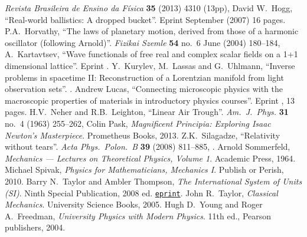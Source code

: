 \begin{thebibliography}{99}
  \emph{Revista Brasileira de Ensino da F\'isica} \textbf{35} 
  (2013) 4310 (13pp), 
  David W.~Hogg, ``Real-world ballistics: A dropped bucket''.
  Eprint  September (2007) 16 pages.
  P.A.~Horvathy,
  ``The laws of planetary motion, derived from those of a harmonic oscillator (following Arnold)''.
  \emph{Fizikai Szemle} \textbf{54} no.~6 June (2004) 180--184,
  A.~Kartavtsev,
  ``Wave functionals of free real and complex scalar fields on a 1+1 dimensional lattice''.
  Eprint .
  Y.~Kurylev, M.~Lassas and G.~Uhlmann,
  ``Inverse problems in spacetime II: Reconstruction of a Lorentzian manifold from light observation sets''.
  .
  Andrew Lucas,
  ``Connecting microscopic physics with the macroscopic properties of materials in introductory physics courses''.
  Eprint , 13 pages.
  H.V.~Neher and R.B.~Leighton,
  ``Linear Air Trough''.
  \emph{Am.\ J.\ Phys.} {\bf 31} no.~4 (1963) 255--262,
  Colin Pask,
  \emph{Magnificent Principia: Exploring Isaac Newton's Masterpiece}.
  Prometheus Books, 2013.
  Z.K.~Silagadze,
  ``Relativity without tears''.
  \emph{Acta Phys.~Polon.~B} {\bf 39} (2008) 811--885,
  .
  Arnold Sommerfeld,
  \emph{Mechanics --- Lectures on Theoretical Physics, Volume 1}.
  Academic Press, 1964.
  Michael Spivak,
  \emph{Physics for Mathematicians, Mechanics I}.
  Publish or Perish, 2010.
Barry N.\ Taylor and Ambler Thompson, 
\emph{The International System of Units (SI)}.
Ninth Special Publication, 2008 ed.
\href{http://physics.nist.gov/Pubs/SP330/sp330.pdf}{{\tt eprint}}.
  John R.~Taylor,
  \emph{Classical Mechanics}.
  University Science Books, 2005.
  Hugh D.~Young and Roger A.~Freedman,
  \emph{University Physics with Modern Physics}.
  11th ed., Pearson publishers, 2004.
\end{thebibliography}
